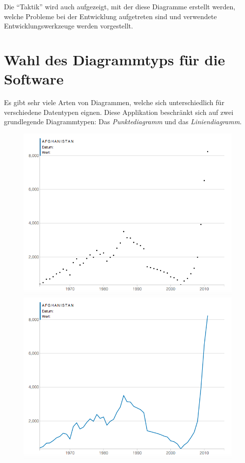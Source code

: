 Die "`Taktik"' wird auch aufgezeigt, mit der diese Diagramme erstellt werden, welche Probleme bei der Entwicklung aufgetreten sind und verwendete Entwicklungswerkzeuge werden vorgestellt.

\section{Wahl des Diagrammtyps für die Software}

Es gibt sehr viele Arten von Diagrammen, welche sich unterschiedlich für verschiedene Datentypen eignen. 
Diese Applikation beschränkt sich auf zwei grundlegende Diagrammtypen: Das \textit{Punktediagramm} und das \textit{Liniendiagramm}.

\begin{figure}[!htbp]
	\centering
	\begin{minipage}{0.45\textwidth}
		\centering
		\includegraphics[width=\linewidth]{images/scatterplot_no_interpolation}
	\end{minipage}\hfill
	\begin{minipage}{0.45\textwidth}
		\centering
		\includegraphics[width=\linewidth]{images/scatterplot_interpolated}

\end{minipage}
\end{figure}
